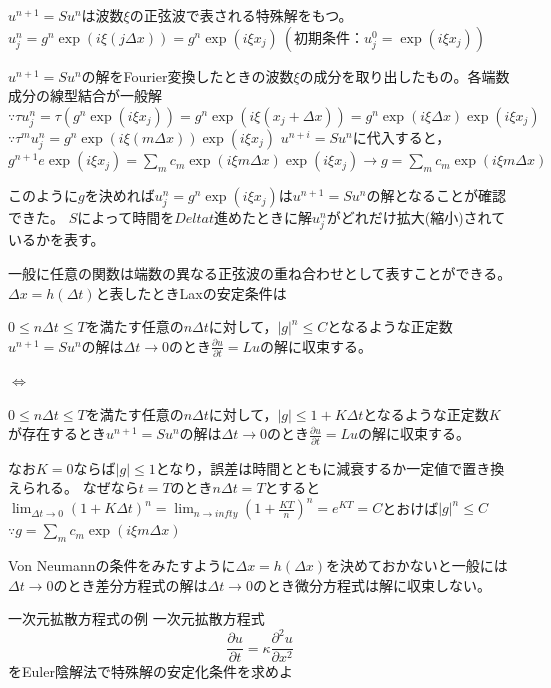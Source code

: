 
    $u^{n+ 1}= Su^n$は波数$\xi$の正弦波で表される特殊解をもつ。
    $u^n_j= g^n\exp{(i\xi(j\Delta x))}= g^n\exp{(i\xi x_j)}\ (初期条件：u^0_j= \exp{(i\xi x_j)})$

    $u^{n+ 1}= Su^n$の解をFourier変換したときの波数$\xi$の成分を取り出したもの。各端数成分の線型結合が一般解
    $\because \tau u^n_j= \tau(g^n\exp{(i\xi x_j)})= g^n\exp{(i\xi(x_j+ \Delta x))}= g^n\exp{(i\xi \Delta x)}\exp{(i\xi x_j)}$
    $\because \tau^mu^n_j= g^n\exp{(i\xi(m\Delta x))}\exp{(i\xi x_j)}$
    $u^{n+ i}= Su^n$に代入すると，
    $g^{n+ 1}e\exp{(i\xi x_j)}= \sum_m c_m\exp{(i\xi m\Delta x)}\exp{(i\xi x_j)}\to g= \sum_m c_m\exp{(i\xi m\Delta x)}$

    このように$g$を決めれば$u^n_j= g^n\exp{(i\xi x_j)}$は$u^{n+ 1}= Su^n$の解となることが確認できた。
    $S$によって時間を$Delta t$進めたときに解$u^n_j$がどれだけ拡大(縮小)されているかを表す。

    一般に任意の関数は端数の異なる正弦波の重ね合わせとして表すことができる。$\Delta x= h(\Delta t)$と表したときLaxの安定条件は
\begin{tcolorbox}
    $0\le n\Delta t\le T$を満たす任意の$n\Delta t$に対して，$|g|^n\le C$となるような正定数$u^{n+ 1}= Su^n$の解は$\Delta t\to 0$のとき$\frac{\partial u}{\partial t}= Lu$の解に収束する。 
\end{tcolorbox}
    $\Leftrightarrow$
\begin{tcolorbox}[title= Von\ Neumannの条件]
    $0\le n\Delta t\le T$を満たす任意の$n\Delta t$に対して，$|g|\le 1+ K\Delta t$となるような正定数$K$が存在するとき$u^{n+ 1}= Su^n$の解は$\Delta t\to 0$のとき$\frac{\partial u}{\partial t}= Lu$の解に収束する。
\end{tcolorbox}
    なお$K= 0$ならば$|g|\le 1$となり，誤差は時間とともに減衰するか一定値で置き換えられる。
    なぜなら$t= T$のとき$n\Delta t= T$とすると$\lim_{\Delta t\to 0} (1+ K\Delta t)^n= \lim_{n\to infty} \left(1+ \frac{KT}{n}\right)^n= e^{KT}= C$とおけば$|g|^n\le C$
    $\because g= \sum_m c_m\exp{(i\xi m\Delta x)}$

    Von Neumannの条件をみたすように$\Delta x= h(\Delta x)$を決めておかないと一般には$\Delta t\to 0$のとき差分方程式の解は$\Delta t\to 0$のとき微分方程式は解に収束しない。


    一次元拡散方程式の例
    一次元拡散方程式
    \begin{equation*}
    \frac{\partial u}{\partial t}= \kappa\frac{\partial^2 u}{\partial x^2}
\end{equation*}
    をEuler陰解法で特殊解の安定化条件を求めよ